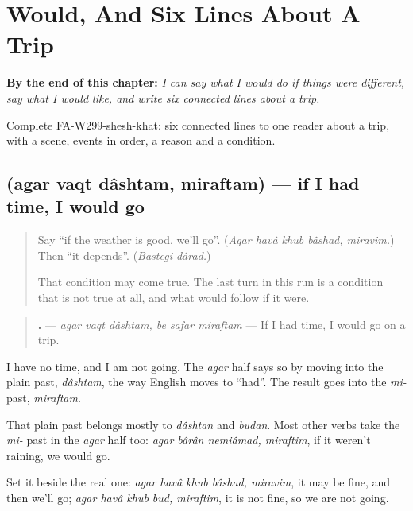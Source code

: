
\chapter{Would, And Six Lines About A Trip}
\label{ch:fa-would-and-six-lines}

\begin{chapteropening}
\textbf{By the end of this chapter:} \emph{I can say what I would do if things were different, say what I would like, and write six connected lines about a trip.}

Complete FA-W299-shesh-khat: six connected lines to one reader about a trip, with a scene, events in order, a reason and a condition.
\end{chapteropening}

\section[\texorpdfstring{\fa{اگر} \fa{وقت} \fa{داشتم،} … (agar vaqt …)}{اگر وقت داشتم، … (agar vaqt …)}]{    (agar vaqt dâshtam, miraftam) — if I had time, I would go}

\label{lesson:FA-C299-agar-vaqt-dashtam}



\begin{quote}
Say \textquotedblleft{}if the weather is good, we'll go\textquotedblright{}. (\emph{Agar havâ khub bâshad, miravim.}) Then \textquotedblleft{}it depends\textquotedblright{}. (\emph{Bastegi dârad.})

That condition may come true. The last turn in this run is a condition that is not true at all, and what would follow if it were.
\end{quote}

\begin{grammarlens}[title={Grammar Lens: a past after agar, the mi- past after it}]
\begin{quote}
\textbf{     .} — \emph{agar vaqt dâshtam, be safar miraftam} — If I had time, I would go on a trip.
\end{quote}

I have no time, and I am not going. The \emph{agar} half says so by moving into the plain past, \emph{dâshtam}, the way English moves to \textquotedblleft{}had\textquotedblright{}. The result goes into the \emph{mi-} past, \emph{miraftam}.

That plain past belongs mostly to \emph{dâshtan} and \emph{budan}. Most other verbs take the \emph{mi-} past in the \emph{agar} half too: \emph{agar bârân nemiâmad, miraftim}, if it weren't raining, we would go.

Set it beside the real one: \emph{agar havâ khub bâshad, miravim}, it may be fine, and then we'll go; \emph{agar havâ khub bud, miraftim}, it is not fine, so we are not going.
\end{grammarlens}

